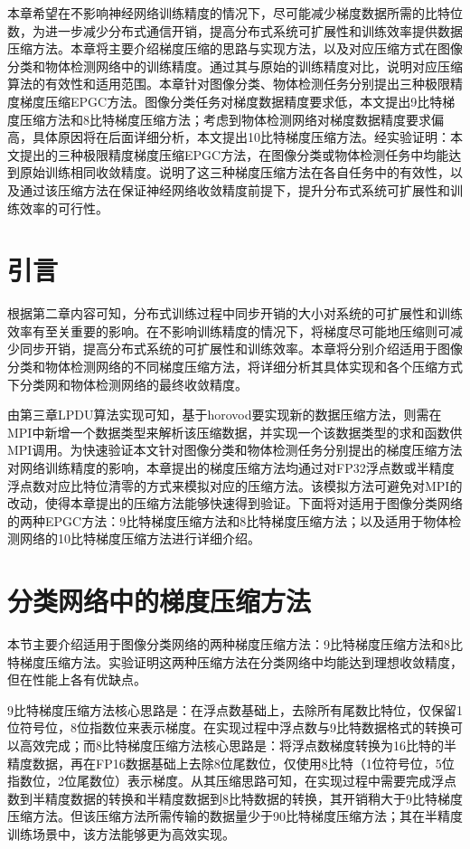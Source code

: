 本章希望在不影响神经网络训练精度的情况下，尽可能减少梯度数据所需的比特位数，为进一步减少分布式通信开销，提高分布式系统可扩展性和训练效率提供数据压缩方法。本章将主要介绍梯度压缩的思路与实现方法，以及对应压缩方式在图像分类和物体检测网络中的训练精度。通过其与原始的训练精度对比，说明对应压缩算法的有效性和适用范围。本章针对图像分类、物体检测任务分别提出三种极限精度梯度压缩EPGC方法。图像分类任务对梯度数据精度要求低，本文提出9比特梯度压缩方法和8比特梯度压缩方法；考虑到物体检测网络对梯度数据精度要求偏高，具体原因将在后面详细分析，本文提出10比特梯度压缩方法。经实验证明：本文提出的三种极限精度梯度压缩EPGC方法，在图像分类或物体检测任务中均能达到原始训练相同收敛精度。说明了这三种梯度压缩方法在各自任务中的有效性，以及通过该压缩方法在保证神经网络收敛精度前提下，提升分布式系统可扩展性和训练效率的可行性。
\section{引言}
根据第二章内容可知，分布式训练过程中同步开销的大小对系统的可扩展性和训练效率有至关重要的影响。在不影响训练精度的情况下，将梯度尽可能地压缩则可减少同步开销，提高分布式系统的可扩展性和训练效率。本章将分别介绍适用于图像分类和物体检测网络的不同梯度压缩方法，将详细分析其具体实现和各个压缩方式下分类网和物体检测网络的最终收敛精度。

由第三章LPDU算法实现可知，基于horovod要实现新的数据压缩方法，则需在MPI中新增一个数据类型来解析该压缩数据，并实现一个该数据类型的求和函数供MPI调用。为快速验证本文针对图像分类和物体检测任务分别提出的梯度压缩方法对网络训练精度的影响，本章提出的梯度压缩方法均通过对FP32浮点数或半精度浮点数对应比特位清零的方式来模拟对应的压缩方法。该模拟方法可避免对MPI的改动，使得本章提出的压缩方法能够快速得到验证。下面将对适用于图像分类网络的两种EPGC方法：9比特梯度压缩方法和8比特梯度压缩方法；以及适用于物体检测网络的10比特梯度压缩方法进行详细介绍。
\section{分类网络中的梯度压缩方法}
本节主要介绍适用于图像分类网络的两种梯度压缩方法：9比特梯度压缩方法和8比特梯度压缩方法。实验证明这两种压缩方法在分类网络中均能达到理想收敛精度，但在性能上各有优缺点。

9比特梯度压缩方法核心思路是：在浮点数基础上，去除所有尾数比特位，仅保留1位符号位，8位指数位来表示梯度。在实现过程中浮点数与9比特数据格式的转换可以高效完成；而8比特梯度压缩方法核心思路是：将浮点数梯度转换为16比特的半精度数据，再在FP16数据基础上去除8位尾数位，仅使用8比特（1位符号位，5位指数位，2位尾数位）表示梯度。从其压缩思路可知，在实现过程中需要完成浮点数到半精度数据的转换和半精度数据到8比特数据的转换，其开销稍大于9比特梯度压缩方法。但该压缩方法所需传输的数据量少于90比特梯度压缩方法；其在半精度训练场景中，该方法能够更为高效实现。

